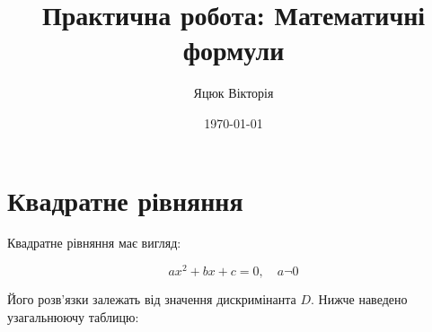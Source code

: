 \documentclass[12pt]{article} %
\title{Практична робота: Математичні формули}
\author{Яцюк Вікторія}
\date{\today}
\begin{document}
\maketitle %
 \section* {Квадратне рівняння}  

Квадратне рівняння має вигляд:

\begin{equation}
ax^2 + bx + c = 0, \quad a \neg 0
\end{equation}

Його розв'язки залежать від значення дискримінанта $D$. Нижче наведено узагальнюючу таблицю:
\end{document}
